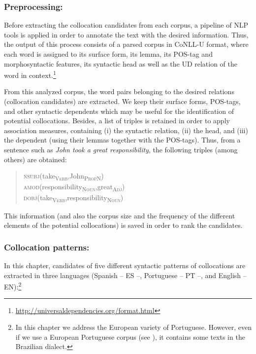 \documentclass[output=paper
,modfonts
,nonflat]{langsci/langscibook}
\begin{document}
\subsubsection{Preprocessing:} Before extracting the collocation candidates from each
corpus, a pipeline of NLP tools is applied in order to annotate the text with the
desired information. Thus, the output of this process consists of a parsed corpus
in CoNLL-U format, where each word is assigned to its surface form, its lemma, its
POS-tag and morphosyntactic features, its syntactic head as well as the UD
relation of the word in context.\footnote{\scriptsize{\url{http://universaldependencies.org/format.html}}}

From this analyzed corpus, the word pairs belonging to the desired relations
(collocation candidates) are extracted. We keep their surface forms, POS-tags,
and other syntactic dependents which may be useful for the identification
of potential collocations. Besides, a list of triples is retained in order to apply association measures,
containing (i) the syntactic relation, (ii) the head, and (iii) the dependent (using their lemmas
together with the POS-tags). Thus, from a sentence such as \emph{John took a great responsibility},
the following triples (among others) are obtained:

\begin{quotation}
  \noindent\textsc{nsubj}(take\textsubscript{\textsc{Verb}},John\textsubscript{\textsc{PropN}})\\
  \textsc{amod}(responsibility\textsubscript{\textsc{Noun}},great\textsubscript{\textsc{Adj}})\\
  \textsc{dobj}(take\textsubscript{\textsc{Verb}},responsibility\textsubscript{\textsc{Noun}})
\end{quotation}

This information (and also the corpus size and the frequency of the different elements
of the potential collocations) is saved in order to rank the candidates.

\subsubsection{Collocation patterns:} In this chapter, candidates of five different syntactic
patterns of collocations are extracted in three languages (Spanish -- ES --, Portuguese
-- PT --, and English -- EN):\footnote{In this chapter we address the European variety of Portuguese.
  However, even if we use a European Portuguese corpus (see ),
  it contains some texts in the Brazilian dialect.}
\end{document}
